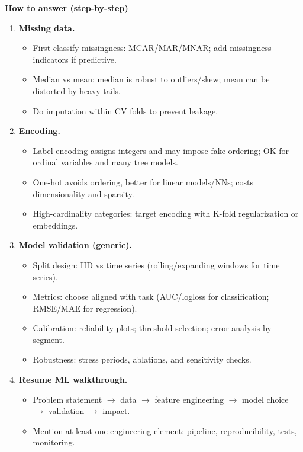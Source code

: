 \documentclass[11pt,letterpaper,openany]{book}
\begin{document}
\textbf{How to answer (step-by-step)}
\begin{enumerate}
  \item \textbf{Missing data.}
  \begin{itemize}
    \item First classify missingness: MCAR/MAR/MNAR; add missingness indicators if predictive.
    \item Median vs mean: median is robust to outliers/skew; mean can be distorted by heavy tails.
    \item Do imputation within CV folds to prevent leakage.
  \end{itemize}

  \item \textbf{Encoding.}
  \begin{itemize}
    \item Label encoding assigns integers and may impose fake ordering; OK for ordinal variables and many tree models.
    \item One-hot avoids ordering, better for linear models/NNs; costs dimensionality and sparsity.
    \item High-cardinality categories: target encoding with K-fold regularization or embeddings.
  \end{itemize}

  \item \textbf{Model validation (generic).}
  \begin{itemize}
    \item Split design: IID vs time series (rolling/expanding windows for time series).
    \item Metrics: choose aligned with task (AUC/logloss for classification; RMSE/MAE for regression).
    \item Calibration: reliability plots; threshold selection; error analysis by segment.
    \item Robustness: stress periods, ablations, and sensitivity checks.
  \end{itemize}

  \item \textbf{Resume ML walkthrough.}
  \begin{itemize}
    \item Problem statement $\to$ data $\to$ feature engineering $\to$ model choice $\to$ validation $\to$ impact.
    \item Mention at least one engineering element: pipeline, reproducibility, tests, monitoring.
  \end{itemize}
\end{enumerate}
\end{document}
